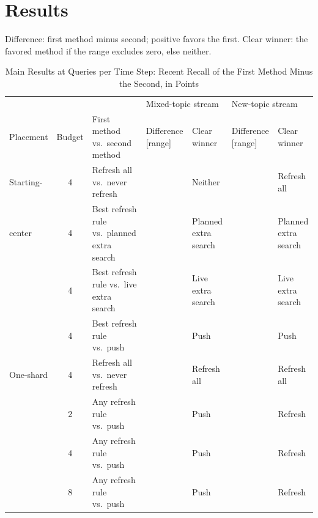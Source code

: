 \section{Results}
\label{sec:results}

\begin{table}[!t]
\centering
\caption{Main Results at \RNumPlainQueriesDefault{} Queries per Time Step: Recent Recall of the First Method Minus the Second, in Points}
\label{tab:main}
\footnotesize
\parbox{\textwidth}{\centering Difference: first method minus second; positive favors the first. Clear winner: the favored method if the \RNumCIPct{} range excludes zero, else neither.}

\vspace{3pt}
\setlength{\tabcolsep}{1.1pt}
\renewcommand{\arraystretch}{0.88}
\begin{tabular}{@{}lclllll@{}}
\toprule
 & & & \multicolumn{2}{l}{Mixed-topic stream} & \multicolumn{2}{l}{New-topic stream} \\
Placement & Budget & First method vs.\ second method & Difference [range] & Clear winner & Difference [range] & Clear winner \\
\midrule
Starting- & 4 & Refresh all vs.\ never refresh & \RNumPlainCellHOneGapSteady{} & Neither & \RNumPlainCellHOneGapNewTopic{} & Refresh all \\
center & 4 & Best refresh rule vs.\ planned extra search & \RNumQSweepRefMinusESQTwoHundredSteadyCell{} & Planned extra search & \RNumQSweepRefMinusESQTwoHundredNewTopicCell{} & Planned extra search \\
 & 4 & Best refresh rule vs.\ live extra search & \RNumQSweepRefMinusESOQTwoHundredSteadyCell{} & Live extra search & \RNumQSweepRefMinusESOQTwoHundredNewTopicCell{} & Live extra search \\
 & 4 & Best refresh rule vs.\ push & \RNumQSweepRefMinusPVQTwoHundredSteadyCell{} & Push & \RNumQSweepRefMinusPVQTwoHundredNewTopicCell{} & Push \\
\midrule
One-shard & 4 & Refresh all vs.\ never refresh & \RNumPlainCellGateMTwoSteady{} & Refresh all & \RNumPlainCellGateMTwoNewTopic{} & Refresh all \\
 & 2 & Any refresh rule vs.\ push & \RNumHFourRefMinusPVBTwoSteadyCell{} & Push & \RNumHFourRefMinusPVBTwoNewTopicCell{} & Refresh \\
 & 4 & Any refresh rule vs.\ push & \RNumHFourRefMinusPVBFourSteadyCell{} & Push & \RNumHFourRefMinusPVBFourNewTopicCell{} & Refresh \\
 & 8 & Any refresh rule vs.\ push & \RNumHFourRefMinusPVBEightSteadyCell{} & Push & \RNumHFourRefMinusPVBEightNewTopicCell{} & Refresh \\

\end{tabular}
\end{table}
